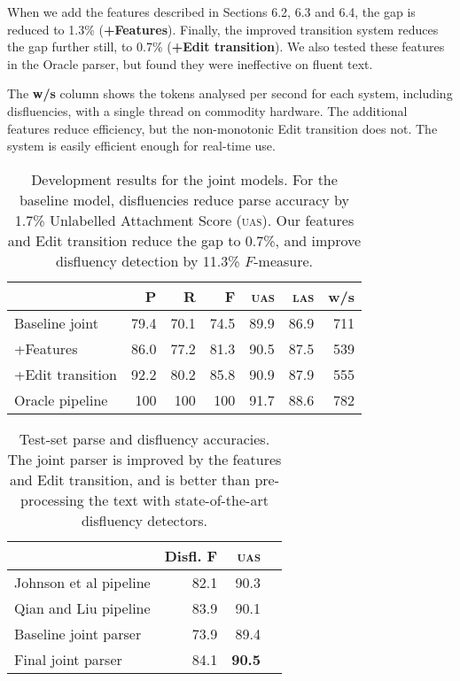 \documentclass[11pt,letterpaper]{article}
\begin{document}
When we add the features described in Sections 6.2, 6.3 and 6.4, the gap is reduced
to 1.3\% (\textbf{+Features}).  Finally, the improved transition system reduces
the gap further still, to 0.7\% (\textbf{+Edit transition}).  We also tested
these features in the Oracle parser, but found they were ineffective on fluent
text.

The \textbf{w/s} column shows the tokens analysed per second for each system,
including disfluencies, with a single thread on commodity hardware.  The additional
features reduce efficiency, but the non-monotonic Edit transition does not.  The
system is easily efficient enough for real-time use.


\begin{table}
    \centering
    \small
    \begin{tabular}{l|rrr|rr|r}
        & P & R & F & \textsc{uas} & \textsc{las} & w/s \\
        \hline \hline
        Baseline joint        &	79.4 &	70.1 &	74.5 &	89.9 &	86.9 & 711 \\
        +Features             &	86.0 &	77.2 &	81.3 &	90.5 &	87.5 & 539 \\ 
        +Edit transition      &	92.2 &	80.2 &	85.8 &	90.9 &	87.9 & 555 \\ 
\hline       
Oracle pipeline  & 100 & 100 & 100 & 91.7    & 88.6 & 782 \\
\hline
    \end{tabular}
    \caption{\small Development results for the joint models.
        For the baseline model, disfluencies reduce
        parse accuracy by 1.7\% Unlabelled Attachment Score (\textsc{uas}). 
        Our features and Edit transition reduce the gap to
        0.7\%, and improve disfluency detection by 11.3\% $F$-measure.
        \label{tab:dev}}
\end{table}


\begin{table}
    \small
    \centering
    \begin{tabular}{l|r|r|r}
        & Disfl. F & \textsc{uas} \\
        \hline \hline
        Johnson et al pipeline      & 82.1 & 90.3 \\ 
        Qian and Liu  pipeline      & 83.9 & 90.1 \\
\hline
Baseline joint parser & 73.9 & 89.4 & \\
Final joint parser    & 84.1 & \textbf{90.5} \\
\hline
    \end{tabular}
    \caption{\small Test-set parse and disfluency accuracies.
             The joint parser is improved by the features and Edit transition,
             and is better than pre-processing the text with state-of-the-art
             disfluency detectors.
    \label{tab:test}}
\vspace*{-1.0ex}
\end{table}
\end{document}
